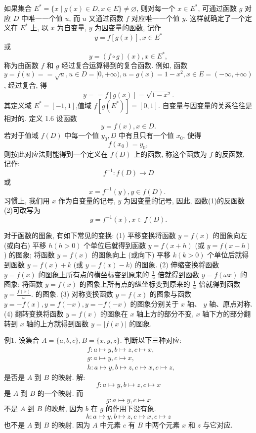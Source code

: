 如果集合 $E^*=\{x \mid g(x) \in D, x \in E\} \neq  \varnothing$, 则对每一个 $x \in E^*$, 可通过函数 $g$ 对应 $D$ 中唯一一个值 $u$, 而 $u$ 又通过函数 $f$ 对应唯一一个值 $y$. 这样就确定了一个定义在 $E^*$ 上, 以 $x$ 为自变量, $y$ 为因变量的函数, 记作
$$
y=f[g(x)], x \in E^*
$$
或
$$
y=(f \circ g)(x), x \in E^*,
$$
称为由函数 $f$ 和 $g$ 经过复合运算得到的复合函数.
例如, 函数 $y=f(u)==\sqrt{u}, u \in D=[0,+\infty), u=g(x)=1-x^2 ,x \in E=(-\infty,+\infty)$, 经过复合, 得
$$
y==f[g(x)]=\sqrt{1-x^2} .
$$
其定义域 $E^*=[-1,1]$,值域 $f\left[g\left(E^*\right)\right]=[0,1]$.
自变量与因变量的关系往往是相对的.
定义 1.6 设函数
$$
y=f(x), x \in D .
$$
若对于值域 $f(D)$ 中每一个值 $y_0, D$ 中有且只有一个值 $x_0$, 使得
$$
f\left(x_0\right)=y_0,
$$
则按此对应法则能得到一个定义在 $f(D)$ 上的函数, 称这个函数为 $f$ 的反函数, 记作:
$$
f^{-1}: f(D) \rightarrow D
$$
或
$$
x=f^{-1}(y), y \in f(D) \text {. }
$$
习惯上, 我们用 $x$ 作为自变量的记号, $y$ 为因变量的记号, 因此, 函数(1)的反函数(2)可改写为
$$
y=f^{-1}(x), x \in f(D) .
$$



对于函数的图象, 有如下常见的变换:
(1) 平移变换将函数 $y=f(x)$ 的图象向左(或向右) 平移 $h(h>0)$ 个单位后就得到函数 $y=f(x+h)$ (或 $y=f(x-h)$ ) 的图象; 将函数 $y=f(x)$ 的图象向上 (或向下) 平移 $k(k>0)$ 个单位后就得到函数 $y=f(x)+k$ (或 $y=f(x)-k)$ 的图象.
(2) 伸缩变换将函数 $y=f(x)$ 的图象上所有点的横坐标变到原来的 $\frac{1}{\omega}$ 倍就得到函数 $y=f(\omega x)$ 的图象; 将函数 $y=f(x)$ 的图象上所有点的纵坐标变到原来的 $\frac{1}{\omega}$ 倍就得到函数 $y=\frac{f(x)}{\omega}$. 的图象.
(3) 对称变换函数 $y=f(x)$ 的图象与函数 $y=-f(x), y=f(-x) ,y=-f(-x)$ 的图象分别关于 $x$ 轴、 $y$ 轴、原点对称.
(4) 翻转变换将函数 $y=f(x)$ 的图象在 $x$ 轴上方的部分不变, $x$ 轴下方的部分翻转到 $x$ 轴的上方就得到函数 $y=|f(x)|$ 的图象.



例1. 设集合 $A=\{a, b, c\}, B=\{x, y, z\}$.
判断以下三种对应:
$$
\begin{aligned}
& f: a \mapsto y, b \mapsto z, c \mapsto x, \\
& g: a \mapsto y, c \mapsto x, \\
& h: a \mapsto y, b \mapsto z, c \mapsto x, c \mapsto z,
\end{aligned}
$$
是否是 $A$ 到 $B$ 的映射.
解:$$
f: a \mapsto y, b \mapsto z, c \mapsto x
$$
是 $A$ 到 $B$ 的一个映射.
而
$$
g: a \mapsto y, c \longmapsto x
$$
不是 $A$ 到 $B$ 的映射, 因为 $b$ 在 $g$ 的作用下没有象.
$$
h: a \mapsto y, b \mapsto z, c \longmapsto x, c \mapsto z
$$
也不是 $A$ 到 $B$ 的映射.
因为 $A$ 中元素 $c$ 有 $B$ 中两个元素 $x$ 和 $z$ 与它对应.



